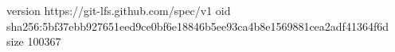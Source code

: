 version https://git-lfs.github.com/spec/v1
oid sha256:5bf37ebb927651eed9ce0bf6e18846b5ee93ca4b8e1569881cea2adf41364f6d
size 100367
